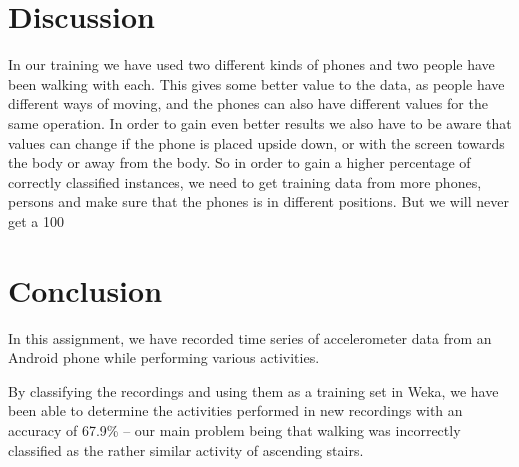 \documentclass{ubicomp2012}
\begin{document}
\section{Discussion}

In our training we have used two different kinds of phones and two people have been walking with each. This gives some better value to the data, as people have different ways of moving, and the phones can also have different values for the same operation. In order to gain even better results we also have to be aware that values can change if the phone is placed upside down, or with the screen towards the body or away from the body. So in order to gain a higher percentage of correctly classified instances, we need to get training data from more phones, persons and make sure that the phones is in different positions. But we will never get a 100%

\section{Conclusion}

In this assignment, we have recorded time series of accelerometer data from an Android phone while performing various activities.

By classifying the recordings and using them as a training set in Weka, we have been able to determine the activities performed in new recordings with an accuracy of 67.9\% -- our main problem being that walking was incorrectly classified as the rather similar activity of ascending stairs.
\end{document}
